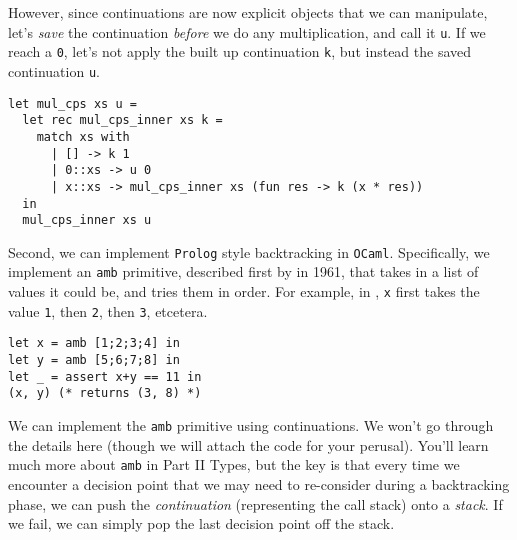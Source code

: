 However, since continuations are now explicit objects that we can manipulate, let's \emph{save} the continuation \emph{before} we do any multiplication, and call it \texttt{u}. If we reach a \texttt{0}, let's not apply the built up continuation \texttt{k}, but instead the saved continuation \texttt{u}.

\begin{code}
\label{code:fib-ocaml-again}
\begin{verbatim}
let mul_cps xs u = 
  let rec mul_cps_inner xs k = 
    match xs with
      | [] -> k 1
      | 0::xs -> u 0
      | x::xs -> mul_cps_inner xs (fun res -> k (x * res))
  in
  mul_cps_inner xs u
\end{verbatim}
\end{code}

Second, we can implement \texttt{Prolog} style backtracking in \texttt{OCaml}. Specifically, we implement an \texttt{amb} primitive, described first by \citet{mccarthy-1963} in 1961, that takes in a list of values it could be, and tries them in order. For example, in , \texttt{x} first takes the value \texttt{1}, then \texttt{2}, then \texttt{3}, etcetera.

\begin{code}
\label{code:amb-specification}
\begin{verbatim}
let x = amb [1;2;3;4] in
let y = amb [5;6;7;8] in
let _ = assert x+y == 11 in
(x, y) (* returns (3, 8) *)
\end{verbatim}
\end{code}

We can implement the \texttt{amb} primitive using continuations. We won't go through the details here (though we will attach the code for your perusal). You'll learn much more about \texttt{amb} in {\sffamily Part II Types}, but the key is that every time we encounter a decision point that we may need to re-consider during a backtracking phase, we can push the \emph{continuation} (representing the call stack) onto a \emph{stack}. If we fail, we can simply pop the last decision point off the stack. 

